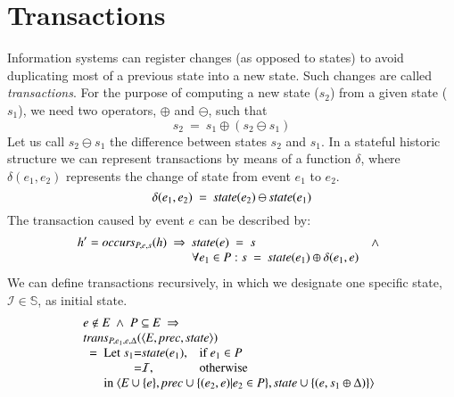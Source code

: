 \documentclass{elsarticle}
\def\id#1{\text{\em #1\/}}
\def\Events{{\mathit E}}
\begin{document}
\section{Transactions}
\label{sct:Transactions}
	Information systems can register changes (as opposed to states) to avoid duplicating most of a previous state into a new state.
	Such changes are called {\em transactions}.
	For the purpose of computing a new state ($s_2$) from a given state ($s_1$),
	we need two operators, $\oplus$ and $\ominus$, such that
\begin{equation}
	s_2\ =\ s_1\oplus(s_2\ominus s_1)
\label{req:oplus and ominus}
\end{equation}
	Let us call $s_2\ominus s_1$ the difference between states $s_2$ and $s_1$.
	In a stateful historic structure we can represent transactions by means of a function $\delta$,
	where $\delta(e_1,e_2)$ represents the change of state from event $e_1$ to $e_2$.
\begin{equation}
	\delta(e_1,e_2)\ =\ \id{state}(e_2)\ominus\id{state}(e_1)
\label{def:delta}
\end{equation}
	The transaction caused by event $e$ can be described by:
\begin{equation}
	h'=\id{occurs}_{P,e,s}(h)\ \Rightarrow\ \begin{array}[t]{@{}ll}
		\id{state}(e)\ =\ s&\wedge\\
		\forall e_1\in P: s\ =\ \id{state}(e_1)\oplus\delta(e_1,e)
	\end{array}
\label{req:transaction}
\end{equation}
	We can define transactions recursively, in which we designate one specific state,
	$\mathcal I\in\mathbb S$,
	as initial state.
\begin{equation}
\begin{array}{l}
	e\notin\Events\ \wedge\ P\subseteq\Events\ \Rightarrow\\
	\id{trans}_{P,e_1,e,\Delta}(\la\Events, \id{prec}, \id{state}\ra)\\
	\ \ =\ \begin{array}[t]{@{}l@{}c@{}ll}
		\text{Let }s_1&=&\id{state}(e_1)\text{,}&\text{if }e_1\in P\\
				&=&\mathcal I\text{,}&\text{otherwise}\\
		\multicolumn{4}{@{}l}{\text{in }\la\Events\cup\{e\}, \id{prec}\cup\{(e_2,e)|e_2\in P\}, \id{state}\cup\{(e,s_1\oplus\Delta)\}\ra}
		\end{array}
\end{array}
\label{req:recursive transaction}
\end{equation}
		
\end{document}
